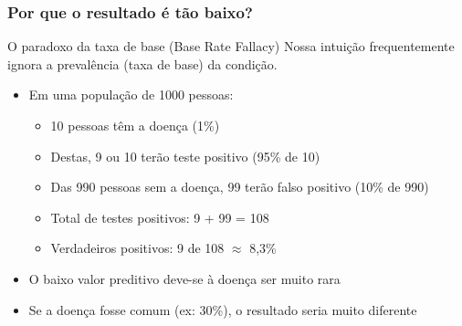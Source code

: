 \documentclass[11pt]{beamer}
\begin{document}





\begin{frame}
\frametitle{Por que o resultado é tão baixo?}
\begin{block}{O paradoxo da taxa de base (Base Rate Fallacy)}
Nossa intuição frequentemente ignora a prevalência (taxa de base) da condição.
\end{block}

\begin{itemize}
\item Em uma população de 1000 pessoas:
  \begin{itemize}
  \item 10 pessoas têm a doença (1\%)
  \item Destas, 9 ou 10 terão teste positivo (95\% de 10)
  \item Das 990 pessoas sem a doença, 99 terão falso positivo (10\% de 990)
  \item Total de testes positivos: 9 + 99 = 108
  \item Verdadeiros positivos: 9 de 108 $\approx$ 8,3\%
  \end{itemize}
\item O baixo valor preditivo deve-se à doença ser muito rara
\item Se a doença fosse comum (ex: 30\%), o resultado seria muito diferente
\end{itemize}
\end{frame}
\end{document}
